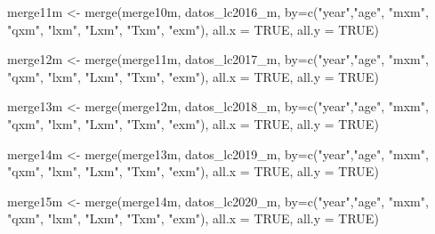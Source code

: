 \documentclass[
]{article}
\newenvironment{Shaded}{\begin{snugshade}}{\end{snugshade}}
\newcommand{\AttributeTok}[1]{\textcolor[rgb]{0.77,0.63,0.00}{#1}}
\newcommand{\ConstantTok}[1]{\textcolor[rgb]{0.00,0.00,0.00}{#1}}
\newcommand{\FunctionTok}[1]{\textcolor[rgb]{0.00,0.00,0.00}{#1}}
\newcommand{\NormalTok}[1]{#1}
\newcommand{\OtherTok}[1]{\textcolor[rgb]{0.56,0.35,0.01}{#1}}
\newcommand{\StringTok}[1]{\textcolor[rgb]{0.31,0.60,0.02}{#1}}
\begin{document}
\begin{Shaded}
\begin{Highlighting}[]
\NormalTok{merge11m }\OtherTok{\textless{}{-}} \FunctionTok{merge}\NormalTok{(merge10m, datos\_lc2016\_m, }\AttributeTok{by=}\FunctionTok{c}\NormalTok{(}\StringTok{"year"}\NormalTok{,}\StringTok{"age"}\NormalTok{, }\StringTok{"mxm"}\NormalTok{, }\StringTok{"qxm"}\NormalTok{, }\StringTok{"lxm"}\NormalTok{, }\StringTok{"Lxm"}\NormalTok{, }\StringTok{"Txm"}\NormalTok{, }\StringTok{"exm"}\NormalTok{), }\AttributeTok{all.x =} \ConstantTok{TRUE}\NormalTok{, }\AttributeTok{all.y =} \ConstantTok{TRUE}\NormalTok{)}

\NormalTok{merge12m }\OtherTok{\textless{}{-}} \FunctionTok{merge}\NormalTok{(merge11m, datos\_lc2017\_m, }\AttributeTok{by=}\FunctionTok{c}\NormalTok{(}\StringTok{"year"}\NormalTok{,}\StringTok{"age"}\NormalTok{, }\StringTok{"mxm"}\NormalTok{, }\StringTok{"qxm"}\NormalTok{, }\StringTok{"lxm"}\NormalTok{, }\StringTok{"Lxm"}\NormalTok{, }\StringTok{"Txm"}\NormalTok{, }\StringTok{"exm"}\NormalTok{), }\AttributeTok{all.x =} \ConstantTok{TRUE}\NormalTok{, }\AttributeTok{all.y =} \ConstantTok{TRUE}\NormalTok{)}

\NormalTok{merge13m }\OtherTok{\textless{}{-}} \FunctionTok{merge}\NormalTok{(merge12m, datos\_lc2018\_m, }\AttributeTok{by=}\FunctionTok{c}\NormalTok{(}\StringTok{"year"}\NormalTok{,}\StringTok{"age"}\NormalTok{, }\StringTok{"mxm"}\NormalTok{, }\StringTok{"qxm"}\NormalTok{, }\StringTok{"lxm"}\NormalTok{, }\StringTok{"Lxm"}\NormalTok{, }\StringTok{"Txm"}\NormalTok{, }\StringTok{"exm"}\NormalTok{), }\AttributeTok{all.x =} \ConstantTok{TRUE}\NormalTok{, }\AttributeTok{all.y =} \ConstantTok{TRUE}\NormalTok{)}

\NormalTok{merge14m }\OtherTok{\textless{}{-}} \FunctionTok{merge}\NormalTok{(merge13m, datos\_lc2019\_m, }\AttributeTok{by=}\FunctionTok{c}\NormalTok{(}\StringTok{"year"}\NormalTok{,}\StringTok{"age"}\NormalTok{, }\StringTok{"mxm"}\NormalTok{, }\StringTok{"qxm"}\NormalTok{, }\StringTok{"lxm"}\NormalTok{, }\StringTok{"Lxm"}\NormalTok{, }\StringTok{"Txm"}\NormalTok{, }\StringTok{"exm"}\NormalTok{), }\AttributeTok{all.x =} \ConstantTok{TRUE}\NormalTok{, }\AttributeTok{all.y =} \ConstantTok{TRUE}\NormalTok{)}

\NormalTok{merge15m }\OtherTok{\textless{}{-}} \FunctionTok{merge}\NormalTok{(merge14m, datos\_lc2020\_m, }\AttributeTok{by=}\FunctionTok{c}\NormalTok{(}\StringTok{"year"}\NormalTok{,}\StringTok{"age"}\NormalTok{, }\StringTok{"mxm"}\NormalTok{, }\StringTok{"qxm"}\NormalTok{, }\StringTok{"lxm"}\NormalTok{, }\StringTok{"Lxm"}\NormalTok{, }\StringTok{"Txm"}\NormalTok{, }\StringTok{"exm"}\NormalTok{), }\AttributeTok{all.x =} \ConstantTok{TRUE}\NormalTok{, }\AttributeTok{all.y =} \ConstantTok{TRUE}\NormalTok{)}


\end{Highlighting}
\end{Shaded}
\end{document}
